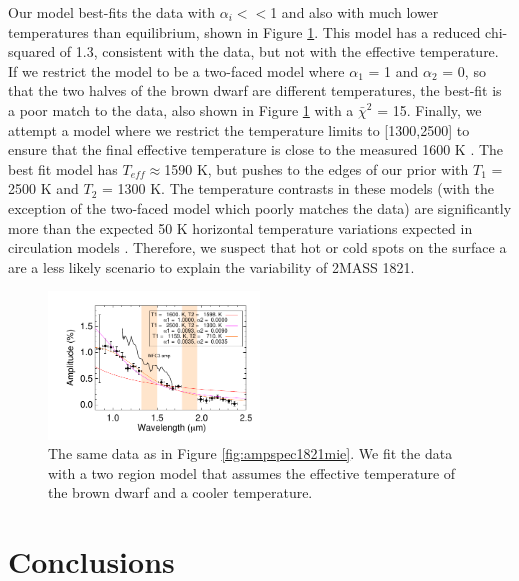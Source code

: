 \documentclass[twocolumn]{aastex6}
\begin{document}
Our model best-fits the data with $\alpha_i << $1 and also with much lower temperatures than equilibrium, shown in Figure \ref{fig:ampspec1821tdiff}.
This model has a reduced chi-squared of 1.3, consistent with the data, but not with the effective temperature.
If we restrict the model to be a two-faced model where $\alpha_1$ = 1 and $\alpha_2$ = 0, so that the two halves of the brown dwarf are different temperatures, the best-fit is a poor match to the data, also shown in Figure \ref{fig:ampspec1821tdiff} with a $\bar{\chi}^2$ = 15.
Finally, we attempt a model where we restrict the temperature limits to [1300,2500] to ensure that the final effective temperature is close to the measured 1600 K \citep{gagne2015banyan7}.
The best fit model has $T_{eff} \approx $1590 K, but pushes to the edges of our prior with $T_1$ = 2500 K and $T_2$ = 1300 K.
The temperature contrasts in these models (with the exception of the two-faced model which poorly matches the data) are significantly more than the expected 50 K horizontal temperature variations expected in circulation models \citep{showman2013bdgpDynamics}.
Therefore, we suspect that hot or cold spots on the surface a are a less likely scenario to explain the variability of 2MASS 1821.

\begin{figure}
\begin{centering}
\includegraphics[width=0.5\textwidth]{amp_vs_wavl_j1821_t_diff.pdf}
\caption{The same data as in Figure \ref{fig:ampspec1821mie}. We fit the data with a two region model that assumes the effective temperature of the brown dwarf and a cooler temperature.}\label{fig:ampspec1821tdiff}
\end{centering}
\end{figure}





\section{Conclusions}\label{sec:conclusions}
\end{document}
